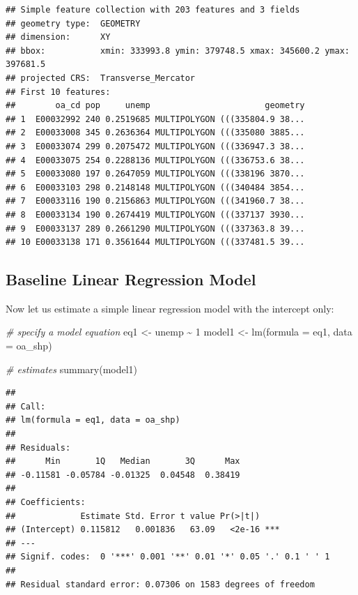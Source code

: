 \documentclass[
]{book}
\newenvironment{Shaded}{\begin{snugshade}}{\end{snugshade}}
\newcommand{\AttributeTok}[1]{\textcolor[rgb]{0.77,0.63,0.00}{#1}}
\newcommand{\CommentTok}[1]{\textcolor[rgb]{0.56,0.35,0.01}{\textit{#1}}}
\newcommand{\DecValTok}[1]{\textcolor[rgb]{0.00,0.00,0.81}{#1}}
\newcommand{\FunctionTok}[1]{\textcolor[rgb]{0.00,0.00,0.00}{#1}}
\newcommand{\NormalTok}[1]{#1}
\newcommand{\OtherTok}[1]{\textcolor[rgb]{0.56,0.35,0.01}{#1}}
\newcommand{\SpecialCharTok}[1]{\textcolor[rgb]{0.00,0.00,0.00}{#1}}
\begin{document}
\begin{verbatim}
## Simple feature collection with 203 features and 3 fields
## geometry type:  GEOMETRY
## dimension:      XY
## bbox:           xmin: 333993.8 ymin: 379748.5 xmax: 345600.2 ymax: 397681.5
## projected CRS:  Transverse_Mercator
## First 10 features:
##        oa_cd pop     unemp                       geometry
## 1  E00032992 240 0.2519685 MULTIPOLYGON (((335804.9 38...
## 2  E00033008 345 0.2636364 MULTIPOLYGON (((335080 3885...
## 3  E00033074 299 0.2075472 MULTIPOLYGON (((336947.3 38...
## 4  E00033075 254 0.2288136 MULTIPOLYGON (((336753.6 38...
## 5  E00033080 197 0.2647059 MULTIPOLYGON (((338196 3870...
## 6  E00033103 298 0.2148148 MULTIPOLYGON (((340484 3854...
## 7  E00033116 190 0.2156863 MULTIPOLYGON (((341960.7 38...
## 8  E00033134 190 0.2674419 MULTIPOLYGON (((337137 3930...
## 9  E00033137 289 0.2661290 MULTIPOLYGON (((337363.8 39...
## 10 E00033138 171 0.3561644 MULTIPOLYGON (((337481.5 39...
\end{verbatim}

\hypertarget{baseline-linear-regression-model}{%
\subsection{Baseline Linear Regression Model}\label{baseline-linear-regression-model}}

Now let us estimate a simple linear regression model with the intercept only:

\begin{Shaded}
\begin{Highlighting}[]
\CommentTok{\# specify a model equation}
\NormalTok{eq1 }\OtherTok{\textless{}{-}}\NormalTok{ unemp }\SpecialCharTok{\textasciitilde{}} \DecValTok{1}
\NormalTok{model1 }\OtherTok{\textless{}{-}} \FunctionTok{lm}\NormalTok{(}\AttributeTok{formula =}\NormalTok{ eq1, }\AttributeTok{data =}\NormalTok{ oa\_shp)}

\CommentTok{\# estimates}
\FunctionTok{summary}\NormalTok{(model1)}
\end{Highlighting}
\end{Shaded}

\begin{verbatim}
## 
## Call:
## lm(formula = eq1, data = oa_shp)
## 
## Residuals:
##      Min       1Q   Median       3Q      Max 
## -0.11581 -0.05784 -0.01325  0.04548  0.38419 
## 
## Coefficients:
##             Estimate Std. Error t value Pr(>|t|)    
## (Intercept) 0.115812   0.001836   63.09   <2e-16 ***
## ---
## Signif. codes:  0 '***' 0.001 '**' 0.01 '*' 0.05 '.' 0.1 ' ' 1
## 
## Residual standard error: 0.07306 on 1583 degrees of freedom
\end{verbatim}
\end{document}
